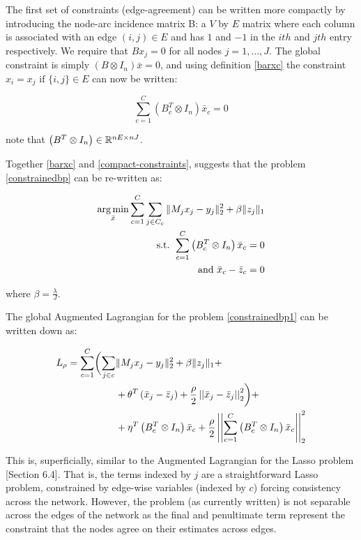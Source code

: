 \documentclass[conference]{IEEEtran}
\begin{document}
The first set of constraints (edge-agreement) can be written more compactly by introducing the node-arc incidence matrix B: a \(V\) by \(E\) matrix where each column is associated with an edge \(\left(i,j\right) \in E\) and has \(1\) and \(-1\) in the \(ith\) and \(jth\) entry respectively. We require that \( Bx_j = 0 \) for all nodes \(j = 1, \ldots,  J\). The global constraint is simply \( (B \otimes I_n)\bar{x} = 0\), and using definition \eqref{barxc} the constraint \(x_i = x_j \text{ if } \{i,j\} \in E \) can now be written:

\begin{equation}
\sum_{c=1}^C\left(B_c^T \otimes I_n\right)\bar{x}_c = 0
\label{compact-constraints}
\end{equation}

note that \(\left(B^T\otimes I_n \right) \in {\mathbb{R}}^{nE \times nJ}\).

 Together \eqref{barxc} and \eqref{compact-constraints}, suggests that the problem \eqref{constrainedbp} can be re-written as:

\begin{align}
\argmin_{\bar{x}} \sum_{c=1}^C \sum_{j \in C_c} \|M_jx_j - y_j\|_2^2 + \beta\|z_j\|_1
\nonumber \\
\text{ s.t. } \sum_{c=1}^C\left(B_c^T \otimes I_n\right)\bar{x}_c = 0 \nonumber \\
\text{ and } \bar{x}_c - \bar{z}_c = 0
\label{constrainedbp1}
\end{align}

where \(\beta = \frac{\lambda}{J}\).

The global Augmented Lagrangian \cite{Boyd2010a}
 for the problem \eqref{constrainedbp1} can be written down as:

\begin{align}
L_\rho = \sum_{c=1}^C  \biggl( \sum_{j \in c} & \|M_jx_j - y_j\|_2^2 + \beta\|z_j\|_1  + \nonumber \\ & + \theta^T\left(\bar{x}_j - \bar{z}_j\right)  +  \frac{\rho}{2}\vectornorm{\bar{x}_j-\bar{z}_j}_2^2 \biggr) + \nonumber \\  & + \eta^T\left(B_c^T \otimes I_n\right)\bar{x}_c + \frac{\rho}{2}\vectornorm{\sum_{c=1}^C\left(B_c^T \otimes I_n\right)\bar{x}_c}_2^2
\label{aug-lagrange}
\end{align}

This is, superficially, similar to the Augmented Lagrangian for the Lasso problem \cite{Boyd2010a}[Section 6.4]. That is, the terms indexed by \(j\) are a straightforward Lasso problem, constrained by edge-wise variables (indexed by \(c\)) forcing consistency across the network. However, the problem (as currently written) is not separable across the edges of the network as the final and penultimate term represent the constraint that the nodes agree on their estimates across edges. 
\end{document}
